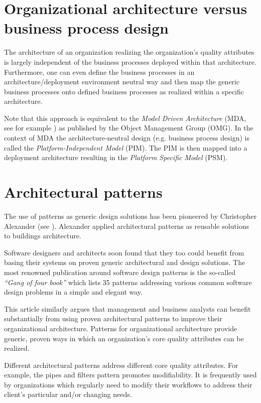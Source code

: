 \documentclass[11pt,english,a4]{article}
\begin{document}
\section{Organizational architecture versus business process design}

The architecture of an organization realizing the organization's quality attributes is largely independent of the business processes deployed within that architecture. Furthermore, one can even define the business processes in an architecture/deployment environment neutral way and then map the generic business processes onto defined business processes as realized within a specific architecture. 

Note that this approach is equivalent to the {\em{Model Driven Architecture}} (MDA, see for example \cite{Frankel-2003}) as published by the Object Management Group (OMG). In the context of MDA the architecture-neutral design (e.g. business process design) is called the {\em{Platform-Independent Model}} (PIM). The PIM is then mapped into a deployment architecture resulting in the {\em{Platform Specific Model}} (PSM).

\section{Architectural patterns}

The use of patterns as generic design solutions has been pioneered by Christopher Alexander (see \cite{Alexander-1979}). Alexander applied architectural patterns as reusable solutions to buildings architecture.

Software designers and architects soon found that they too could benefit from basing their systems on proven generic architectural and design solutions. The most renowned publication around software design patterns is the so-called {\em{``Gang of four book''}} \cite{Gamma-Helm-Johnson-Vlissides-1995} which lists 35 patterns addressing various common software design problems in a simple and elegant way.

This article similarly argues that management and business analysts can benefit substantially from using proven architectural patterns to improve their organizational architecture. Patterns for organizational architecture provide generic, proven ways in which an organization's core quality attributes can be realized.

Different architectural patterns address different core quality attributes. For example, the pipes and filters pattern promotes modifiability. It is frequently used by organizations which regularly need to modify their workflows to address their client's particular and/or changing needs.
\end{document}
